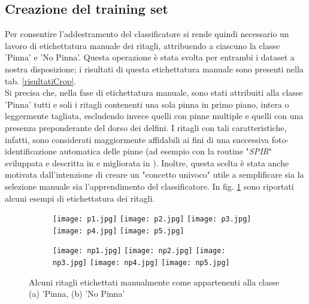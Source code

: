 \subsection*{Creazione del training set}

Per consentire l'addestramento del classificatore si rende quindi necessario un lavoro di etichettatura manuale dei ritagli, attribuendo a ciascuno la classe 'Pinna' e 'No Pinna'. Questa operazione è stata svolta per entrambi i dataset a nostra disposizione; i risultati di questa etichettatura manuale sono presenti nella tab. \ref{risultatiCrop}.\\

Si precisa che, nella fase di etichettatura manuale, sono stati attribuiti alla classe 'Pinna' tutti e soli i ritagli contenenti una sola pinna in primo piano, intera o leggermente tagliata, escludendo invece quelli con pinne multiple e quelli con una presenza preponderante del dorso dei delfini. I ritagli con tali caratteristiche, infatti, sono considerati maggiormente affidabili ai fini di una successiva foto-identificazione automatica delle pinne (ad esempio con la routine "\textit{SPIR}" sviluppata e descritta in \cite{maglietta} e migliorata in \cite{emanuele}). Inoltre, questa scelta è stata anche motivata dall’intenzione di creare un "concetto univoco" utile a semplificare sia la selezione manuale sia l’apprendimento del classificatore.
In fig. \ref{fig:esempiPinnaNoPinna} sono riportati alcuni esempi di etichettatura dei ritagli.

\begin{figure}[h!]

  \centering
  
  \begin{subfigure}[b]{0.7\textwidth}
    \texttt{[image: p1.jpg]}
    \hfill
    \texttt{[image: p2.jpg]}
    \hfill
    \texttt{[image: p3.jpg]}
    \hfill
    \texttt{[image: p4.jpg]}
    \hfill
    \texttt{[image: p5.jpg]}
    \caption{}
  \end{subfigure}
  
  \vspace{5mm}
  
  \begin{subfigure}[b]{0.7\textwidth}
    \texttt{[image: np1.jpg]}
    \hfill
    \texttt{[image: np2.jpg]}
    \hfill
    \texttt{[image: np3.jpg]}
    \hfill
    \texttt{[image: np4.jpg]}
    \hfill
    \texttt{[image: np5.jpg]}
    \caption{}
  \end{subfigure}
  
  \caption{Alcuni ritagli etichettati manualmente come appartenenti alla classe (a) 'Pinna, (b) 'No Pinna'}
  \label{fig:esempiPinnaNoPinna}
\end{figure}

